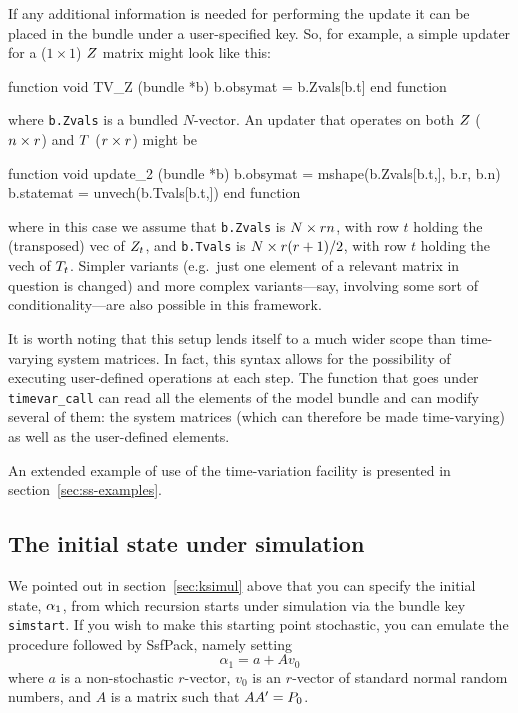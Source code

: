 If any additional information is needed for performing the update it
can be placed in the bundle under a user-specified key.  So, for
example, a simple updater for a ($1 \times 1$) $Z$ matrix might
look like this:
%
\begin{code}
function void TV_Z (bundle *b)
    b.obsymat = b.Zvals[b.t]
end function
\end{code}
%
where \texttt{b.Zvals} is a bundled $N$-vector. An updater that
operates on both $Z$ ($n \times r$) and $T$
($r \times r$) might be
%
\begin{code}
function void update_2 (bundle *b)
    b.obsymat = mshape(b.Zvals[b.t,], b.r, b.n)
    b.statemat = unvech(b.Tvals[b.t,])
end function
\end{code}
%
where in this case we assume that \texttt{b.Zvals} is
$N \times rn$, with row $t$ holding the (transposed) vec of
$Z_t$, and \texttt{b.Tvals} is $N \times r(r +1)/2$,
with row $t$ holding the vech of $T_t$. Simpler variants
(e.g.\ just one element of a relevant matrix in question is changed)
and more complex variants---say, involving some sort of
conditionality---are also possible in this framework.

It is worth noting that this setup lends itself to a much wider scope
than time-varying system matrices. In fact, this syntax allows for the
possibility of executing user-defined operations at each step. The
function that goes under \texttt{timevar\_call} can read all the
elements of the model bundle and can modify several of them: the
system matrices (which can therefore be made time-varying) as well as
the user-defined elements.

An extended example of use of the time-variation facility is presented
in section~\ref{sec:ss-examples}.

\subsection{The initial state under simulation}
\label{sec:simstart}

We pointed out in section~\ref{sec:ksimul} above that you can specify
the initial state, $\alpha_1$, from which recursion starts under
simulation via the bundle key \texttt{simstart}. If you wish to make
this starting point stochastic, you can emulate the procedure followed
by \textsf{SsfPack}, namely setting
\[
\alpha_1 = a + A v_0
\]
where $a$ is a non-stochastic $r$-vector, $v_0$ is an $r$-vector
of standard normal random numbers, and $A$ is a matrix such
that $AA' = P_0$.

